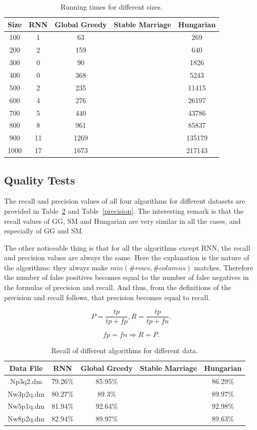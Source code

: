 \documentclass[a4paper,11pt]{article}
\begin{document}
\begin{table}[tbh]
\centering
\begin{tabular}{|c|c|c|c|c|}
\hline 
Size & RNN & Global Greedy & Stable Marriage & Hungarian \tabularnewline
\hline 
\hline 
 100 & 1 & 63 &  & 269\tabularnewline
\hline
 200 & 2 & 159 &  & 640\tabularnewline
\hline 
 300 & 0 & 90 &  & 1826\tabularnewline
\hline 
 400 & 0 & 368 & & 5243\tabularnewline
\hline 
 500 & 2 & 235 &  & 11415\tabularnewline
\hline 
 600 & 4 & 276 &  & 26197\tabularnewline
\hline 
 700 & 5 & 440 &  & 43786\tabularnewline
\hline
 800 & 8 & 961 &  & 85837\tabularnewline
\hline 
 900 & 11 & 1269 &  & 135179\tabularnewline
\hline
 1000 & 17 & 1673 &  & 217143\tabularnewline
\hline 
\end{tabular}
\caption{Running times for different sizes.}
\label{runtimes}
\end{table}

\subsection{Quality Tests}

The recall and precision values of all four algorithms for different datasets are provided in Table~\ref{recall} and Table~\ref{precision}. The interesting remark is that the recall values of GG, SM and Hungarian are very similar in all the cases, and especially of GG and SM. %

The other noticeable thing is that for all the algorithms except RNN, the recall and precision values are always the same. Here the explanation is the nature of the algorithms: they always make $min(\#rows, \#columns)$ matches. Therefore the number of false positives becomes equal to the number of false negatives in the formulas of precision and recall. And thus, from the definitions of the precision and recall follows, that precision becomes equal to recall.


\[P = \frac{tp}{tp+fp}, R = \frac{tp}{tp+fn}.\]

\[fp=fn \Rightarrow R=P.\]

\begin{table}[tbh]
\centering
\begin{tabular}{|c|c|c|c|c|}
\hline 
Data File & RNN & Global Greedy & Stable Marriage & Hungarian \tabularnewline
\hline 
\hline 
 Np3q2.dm & 79.26\% & 85.95\% &  & 86.29\%\tabularnewline
\hline
 Nw3p2q.dm & 80.27\% & 89.3\% &  & 89.97\%\tabularnewline
\hline 
 Nw5p1q.dm & 81.94\% & 92.64\% &  & 92.98\%\tabularnewline
\hline 
 Nw8p2q.dm & 82.94\% & 89.97\% &  & 89.63\%\tabularnewline
\hline
\end{tabular}
\caption{Recall of different algorithms for different data.}
\label{recall}
\end{table}
\end{document}
